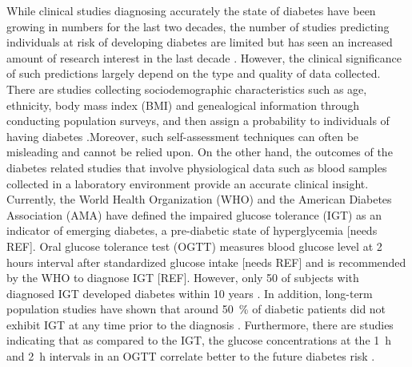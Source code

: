 \documentclass[journal,comsoc]{IEEEtran}
\renewcommand{\^}{\hat}  %
\begin{document}
While clinical studies diagnosing accurately the state of diabetes have been growing in numbers for the last two decades, the number of studies predicting individuals at risk of developing diabetes are limited but has seen an increased amount of research interest in the last decade \cite{noble2011risk}.  However, the clinical significance of such predictions largely depend on the type and quality of data collected. There are studies collecting sociodemographic characteristics such as age, ethnicity, body mass index (BMI) and genealogical information through conducting population surveys, and then assign a probability to individuals of having diabetes \cite{Heikes1040,Glumer727}.Moreover, such self-assessment techniques can often be misleading and cannot be relied upon. On the other hand, the outcomes of the diabetes related studies that involve physiological data such as blood samples collected in a laboratory environment provide an accurate clinical insight. Currently, the World Health Organization (WHO) and the American Diabetes Association (AMA) have defined the impaired glucose tolerance (IGT) as an indicator of emerging diabetes, a pre-diabetic state of hyperglycemia [needs REF]. Oral glucose tolerance test (OGTT) measures blood glucose level at 2 hours interval after standardized glucose intake [needs REF] and is recommended by the WHO to diagnose IGT [REF]. However, only 50 {\percent} of subjects with diagnosed IGT developed diabetes within \num{10} years \cite{shaw_impaired_1999, writing_committee_impaired_2002}. In addition, long-term population studies have shown that around \SI{50} {\percent} of diabetic patients did not exhibit IGT at any time prior to the diagnosis \cite{abdul-ghani_what_2007}. Furthermore, there are studies indicating that as compared to the IGT, the glucose concentrations at the \SI{1}{\hour} and \SI{2}{\hour} intervals in an OGTT correlate better to the future diabetes risk \cite{abdul2009fasting, abdul-ghani_shape_2010, abdul-ghani_plasma_2009}.\\
\end{document}
